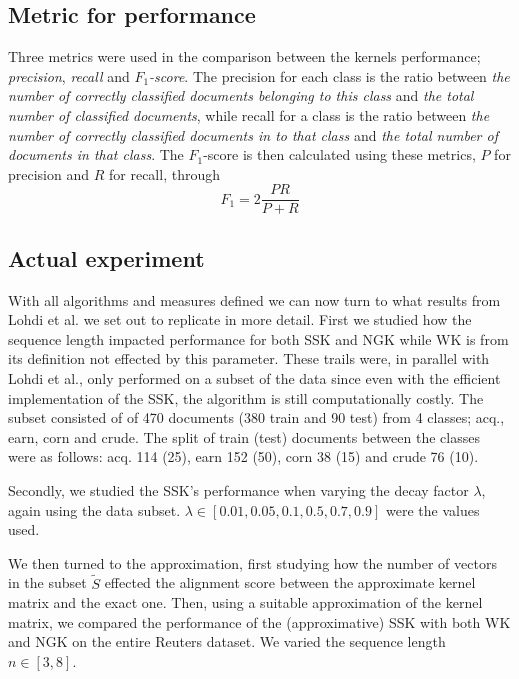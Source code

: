 
\subsection{Metric for performance}
Three metrics were used in the comparison between the kernels performance; \textit{precision}, \textit{recall} and \textit{$ F_1 $-score}. The precision for each class is the ratio between \textit{the number of correctly classified documents belonging to this class} and \textit{the total number of classified documents}, while recall for a class is the ratio between \textit{the number of correctly classified documents in to that class} and \textit{the total number of documents in that class}. The $ F_1 $-score is then calculated using these metrics, $ P $ for precision and $ R $ for recall,  through 
\begin{equation*}\label{key}
F_1 = 2\dfrac{PR}{P+R}
\end{equation*}

\subsection{Actual experiment}
With all algorithms and measures defined we can now turn to what results from Lohdi et al. we set out to replicate in more detail. First we studied how the sequence length impacted performance for both SSK and NGK while WK is from its definition not effected by this parameter. These trails were, in parallel with Lohdi et al., only performed on a subset of the data since even with the efficient implementation of the SSK, the algorithm is still computationally costly. The subset consisted of of 470 documents (380 train and 90 test) from  4 classes; acq., earn, corn and crude. The split of train (test) documents between the classes were as follows: acq. 114 (25), earn 152 (50), corn 38 (15) and crude 76 (10).

Secondly, we studied the SSK's performance when varying the decay factor $ \lambda $, again using the data subset. $ \lambda \in [0.01, 0.05, 0.1, 0.5, 0.7, 0.9] $ were the values used. 

We then turned to the approximation, first studying how the number of vectors in the subset $ \tilde{S} $ effected the alignment score between the approximate kernel matrix and the exact one. Then, using a suitable approximation of the kernel matrix, we compared the performance of the (approximative) SSK with both WK and NGK on the entire Reuters dataset. We varied the sequence length $ n\in [3,8] $.  

